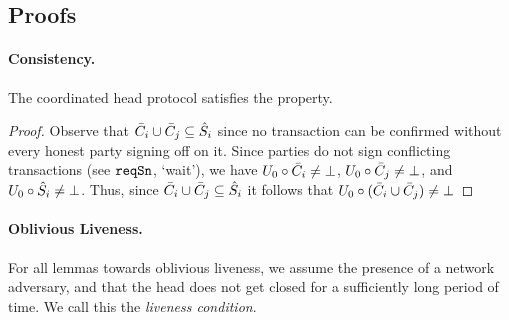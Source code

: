 \subsection{Proofs}

\paragraph{Consistency.}

\begin{lemma}[Consistency]
  \label{lem:consistency}
  The coordinated head protocol satisfies the  property.
\end{lemma}
\begin{proof}
  Observe that $\bar{C}_i\cup\bar{C}_j\subseteq\hat{S}_i$ since no
  transaction can be confirmed without every honest party signing off
  on it.  Since parties do not sign conflicting transactions
  (see $\mathtt{reqSn}$, `wait'), we have
  $U_{0}\circ\bar{C}_i\neq\bot$,
  $U_{0}\circ\bar{C}_j\neq\bot$, and
  $U_{0}\circ\hat{S}_i\neq\bot$.  Thus, since $\bar{C}_i\cup\bar{C}_j\subseteq\hat{S}_i$
  it follows that
  $U_{0}\circ(\bar{C}_i\cup\bar{C}_j)\neq\bot$
\end{proof}

\paragraph{Oblivious Liveness.}
For all lemmas towards oblivious liveness, we assume the presence of a network adversary, and that the head does not get closed for a sufficiently
long period of time.
We call this the \emph{liveness condition}.

